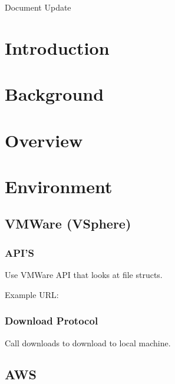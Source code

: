 \documentclass{article}
\title{}
\author{}
\date{}
\begin{document}
    

    \tableofcontents
    \listoffigures

    \newpage
    \begin{versionhistory}
		 {Document Update}
    \end{versionhistory}
    \newpage

    \section{Introduction}
		
    \section{Background}

    \section{Overview}

    \section{Environment}

        \subsection{VMWare (VSphere)}

            \subsubsection{API'S}
            Use VMWare API that looks at file structs.

            Example URL:

            \subsubsection{Download Protocol}
            Call downloads to download to local machine.

        \subsection{AWS}
\end{document}
